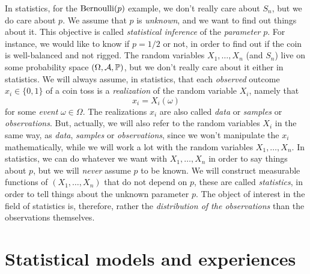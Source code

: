 In statistics, for the $\operatorname{Bernoulli}(p)$ example, we don't really care about $S_n$, but we do care about $p$.
We assume that $p$ is \emph{unknown}, and we want to find out things about it.
This objective is called \emph{statistical inference} of the \emph{parameter} $p$.
For instance, we would like to know if $p=1/2$ or not, in order to find out if the coin is well-balanced and not rigged.
The random variables $X_1, \ldots, X_n$ (and $S_n$) live on some probability space $(\Omega, \operatorname{\mathcal A}, \mathbb P)$, but we don't really care about it either in statistics.
We will always assume, in statistics, that each \emph{observed} outcome $x_i \in \{ 0, 1 \}$ of a coin toss is a \emph{realization} of the random variable $X_i$, namely that
\begin{equation*}
	x_i = X_i(\omega)
\end{equation*}
for some \emph{event} $\omega \in \Omega$.
The realizations $x_i$ are also called \emph{data} or \emph{samples} or \emph{observations}.
But, actually, we will also refer to the random variables $X_i$ in the same way, as \emph{data}, \emph{samples} or \emph{observations}, since we won't manipulate the $x_i$ mathematically,%
%
while we will work a lot with the random variables $X_1, \ldots, X_n$.
In statistics, we can do whatever we want with $X_1, \ldots, X_n$ in order to say things about $p$, but we will \emph{never} assume $p$ to be known.%
We will construct measurable functions of $(X_1, \ldots, X_n)$ that do not depend on $p$, these are called \emph{statistics}, in order to tell things about the unknown parameter $p$.
The object of interest in the field of statistics is, therefore, rather the \emph{distribution of the observations} than the observations themselves.


\section{Statistical models and experiences} %
\label{sec:statistical_models_and_experiences}

